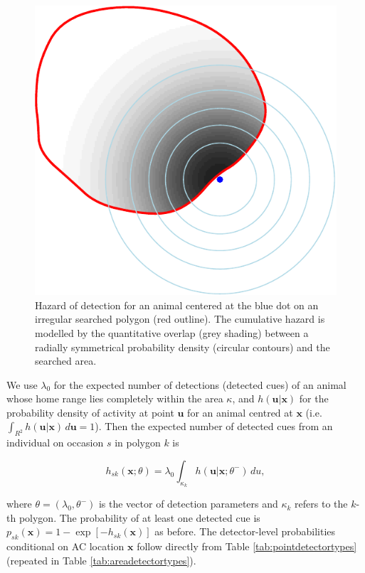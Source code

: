 \documentclass[
]{book}
\begin{document}
\begin{figure}

{\centering \includegraphics{SECRbook_files/figure-latex/overlapplot-1} 

}

\caption{Hazard of detection for an animal centered at the blue dot on an irregular searched polygon (red outline). The cumulative hazard is modelled by the quantitative overlap (grey shading) between a radially symmetrical probability density (circular contours) and the searched area.}\label{fig:overlapplot}
\end{figure}

We use \(\lambda_0\) for the expected number of detections (detected cues) of an animal whose home range lies completely within the area \(\kappa\), and \(h(\mathbf{u}|\mathbf{x})\) for the probability density of activity at point \(\mathbf{u}\) for an animal centred at \(\mathbf{x}\) (i.e.~\(\int_{R^2} h(\mathbf{u}|\mathbf{x}) \, d \mathbf{u} = 1\)). Then the expected number of detected cues from an individual on occasion \(s\) in polygon \(k\) is

\begin{equation}
 h_{sk}(\mathbf{x}; \theta) = \lambda_0 \int_{\kappa_k} h(\mathbf{u}|\mathbf{x}; \theta^-) \, du,
 \label{eq:hsk}
  \end{equation}

where \(\theta = (\lambda_0, \theta^-)\) is the vector of detection parameters and \(\kappa_k\) refers to the \(k\)-th polygon. The probability of at least one detected cue is \(p_{sk}(\mathbf{x}) = 1 - \exp[-h_{sk}(\mathbf{x})]\) as before. The detector-level probabilities conditional on AC location \(\mathbf{x}\) follow directly from Table \ref{tab:pointdetectortypes} (repeated in Table \ref{tab:areadetectortypes}).
\end{document}

